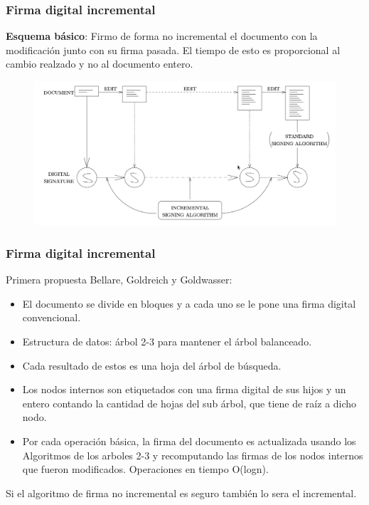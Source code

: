 \documentclass[10pt]{beamer}
\begin{document}
\begin{frame}
\frametitle{Firma digital incremental}

\textbf{Esquema básico}: Firmo de forma no incremental el documento con la modificación junto con su firma pasada.
El tiempo de esto es proporcional al cambio realzado y no al documento entero.

\begin{figure}[h!]
    \centering
    \includegraphics[scale=0.25]{firma.jpg}
\end{figure}


\end{frame}


\begin{frame}
\frametitle{Firma digital incremental}

Primera propuesta Bellare, Goldreich y Goldwasser:
\begin{itemize}\itemsep-1em
  \item El documento se divide en bloques y a cada uno se le pone una firma digital convencional.
\pause
\item Estructura de datos: árbol 2-3 para mantener el árbol balanceado.
  \item  Cada resultado de estos es una hoja del árbol de búsqueda.
\pause
  \item Los nodos internos son etiquetados con una firma digital de sus hijos y un entero contando
la cantidad de hojas del sub árbol, que tiene de raíz a dicho nodo.
\item Por cada operación básica, la firma del documento es actualizada usando los Algoritmos
de los arboles 2-3 y recomputando las firmas de los nodos internos que fueron modificados.
Operaciones en tiempo O(logn).
\end{itemize}


\pause
Si el algoritmo de firma no incremental es seguro también lo sera el incremental.

\end{frame}
\end{document}
